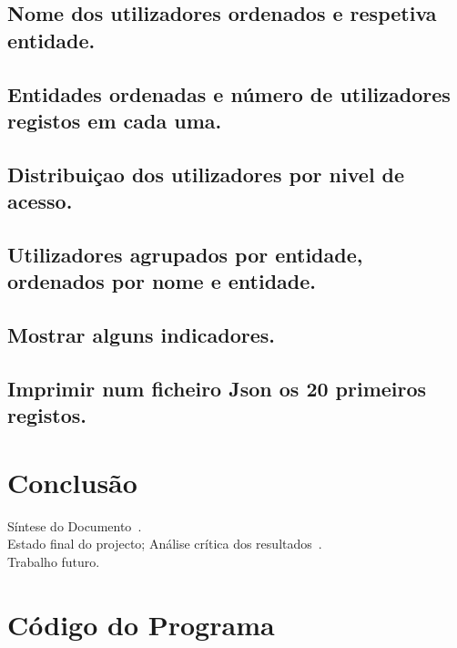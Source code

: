 \documentclass[11pt,a4paper]{report}%
\begin{document}
\section{Nome dos utilizadores ordenados e respetiva entidade.}
\section{Entidades ordenadas e número de utilizadores registos em cada uma.}
\section{Distribuiçao dos utilizadores por nivel de acesso.}
\section{Utilizadores agrupados por entidade, ordenados por nome e entidade.}
\section{Mostrar alguns indicadores.}
\section{Imprimir num ficheiro Json os 20 primeiros registos.}



\chapter{Conclusão} \label{concl}
Síntese do Documento~\cite{araujo:2018,martini:2018}.\\
Estado final do projecto; Análise crítica dos resultados~\cite{Sto77a}.\\
Trabalho futuro.


\appendix %
\chapter{Código do Programa}
\end{document}
